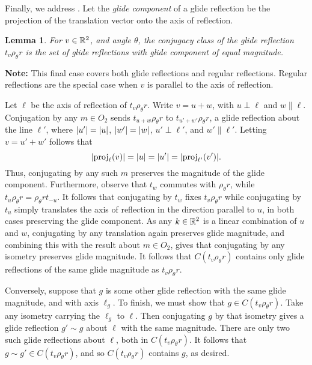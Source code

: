 \documentclass{scrartcl}
\newtheorem{lemma}{Lemma}
\begin{document}
\begin{solution}
    Finally, we address . Let the \textit{glide component} of a glide reflection be the projection of the translation vector onto the axis of reflection.
    \begin{lemma}
    For $v\in \mathbb R^2$, and angle $\theta$, the conjugacy class of the glide reflection $t_v\rho_\theta r$ is the set of glide reflections with glide component of equal magnitude.
    \end{lemma}
    \textbf{Note:} This final case covers both glide reflections and regular reflections. Regular reflections are the special case when $v$ is parallel to the axis of reflection.
    \begin{tproof}
    Let $\ell$ be the axis of reflection of $t_v\rho_\theta r$. Write $v=u+w$, with $u\perp \ell$ and $w\parallel \ell$. Conjugation by any $m\in O_2$ sends $t_{u+w}\rho_\theta r$ to $t_{u'+w'}\rho_\theta r$, a glide reflection about the line $\ell'$, where $\lvert u'\rvert=\lvert u\rvert$, $\lvert w'\rvert=\lvert w\rvert$, $u'\perp \ell'$, and $w'\parallel \ell'$. Letting $v=u'+w'$ follows that
    \[\lvert\operatorname{proj}_\ell(v)\rvert=\lvert u\rvert=\lvert u'\rvert=\lvert\operatorname{proj}_{\ell'}(v')\rvert.\] Thus, conjugating by any such $m$ preserves the magnitude of the glide component. Furthermore, observe that $t_w$ commutes with $\rho_\theta r$, while $t_u\rho_\theta r=\rho_\theta rt_{-u}$. It follows that conjugating by $t_w$ fixes $t_v\rho_\theta r$ while conjugating by $t_u$ simply translates the axis of reflection in the direction parallel to $u$, in both cases preserving the glide component. As any $k\in \mathbb R^2$ is a linear combination of $u$ and $w$, conjugating by any translation again preserves glide magnitude, and combining this with the result about $m\in O_2$, gives that conjugating by any isometry preserves glide magnitude. It follows that $C(t_v\rho_\theta r)$ contains only glide reflections of the same glide magnitude as $t_v\rho_\theta r$.
    
    Conversely, suppose that $g$ is some other glide reflection with the same glide magnitude, and with axis $\ell_g$. To finish, we must show that $g\in C(t_v\rho_\theta r)$. Take any isometry carrying the $\ell_g$ to $\ell$. Then conjugating $g$ by that isometry gives a glide reflection $g'\sim g$ about $\ell$ with the same magnitude. There are only two such glide reflections about $\ell$, both in $C(t_v\rho_\theta r)$. It follows that $g\sim g'\in C(t_v\rho_\theta r)$, and so $C(t_v\rho_\theta r)$ contains $g$, as desired.
    \end{tproof}


\end{solution}
\end{document}
